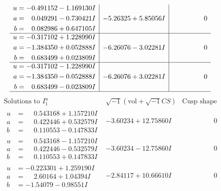 \documentclass[1p]{elsarticle_modified}
\theoremstyle{definition}
\newcommand{\I}{\sqrt{-1}}
\begin{document}
$$\begin{array}{c|c|c}
\begin{aligned}
u &= -0.491152 - 1.169130 I \\
a &= \phantom{-}0.049291 - 0.730421 I \\
b &= \phantom{-}0.082986 + 0.647105 I\end{aligned}
 & -5.26325 + 5.85056 I & \phantom{-0.000000 } 0 \\ \hline\begin{aligned}
u &= -0.317102 + 1.228990 I \\
a &= -1.384350 + 0.052888 I \\
b &= \phantom{-}0.683499 + 0.023809 I\end{aligned}
 & -6.26076 - 3.02281 I & \phantom{-0.000000 } 0 \\ \hline\begin{aligned}
u &= -0.317102 - 1.228990 I \\
a &= -1.384350 - 0.052888 I \\
b &= \phantom{-}0.683499 - 0.023809 I\end{aligned}
 & -6.26076 + 3.02281 I & \phantom{-0.000000 } 0\\
 \hline 
 \end{array}$$\newpage$$\begin{array}{c|c|c}  
\text{Solutions to }I^u_{1}& \I (\text{vol} + \sqrt{-1}CS) & \text{Cusp shape}\\
 \hline 
\begin{aligned}
u &= \phantom{-}0.543168 + 1.157210 I \\
a &= \phantom{-}0.422446 + 0.532579 I \\
b &= \phantom{-}0.110553 - 0.147833 I\end{aligned}
 & -3.60234 + 12.75860 I & \phantom{-0.000000 } 0 \\ \hline\begin{aligned}
u &= \phantom{-}0.543168 - 1.157210 I \\
a &= \phantom{-}0.422446 - 0.532579 I \\
b &= \phantom{-}0.110553 + 0.147833 I\end{aligned}
 & -3.60234 - 12.75860 I & \phantom{-0.000000 } 0 \\ \hline\begin{aligned}
u &= -0.223301 + 1.259190 I \\
a &= \phantom{-}2.60164 + 1.04394 I \\
b &= -1.54079 - 0.98551 I\end{aligned}
 & -2.84117 + 10.66610 I & \phantom{-0.000000 } 0 \\ \hline\begin{aligned}

\end{aligned}
\end{array}$$
\end{document}
